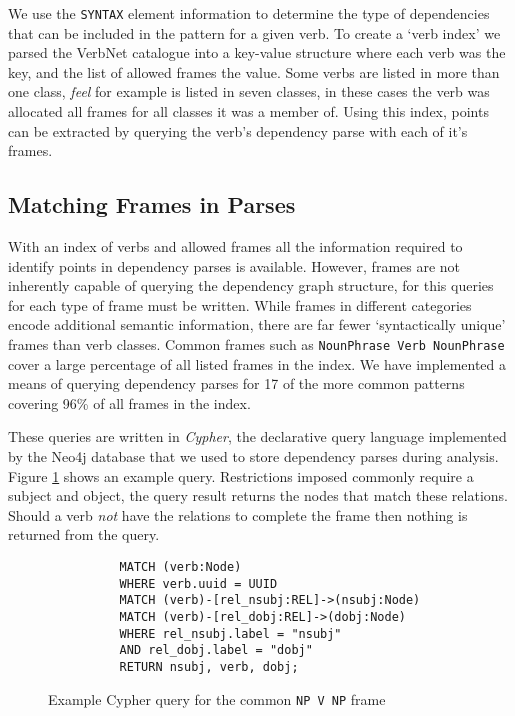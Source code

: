       We use the \texttt{SYNTAX} element information to determine the type of dependencies that can be included in the pattern for a given verb. To create a `verb index' we parsed the VerbNet catalogue into a key-value structure where each verb was the key, and the list of allowed frames the value. Some verbs are listed in more than one class, \textit{feel} for example is listed in seven classes, in these cases the verb was allocated all frames for all classes it was a member of. Using this index, points can be extracted by querying the verb's dependency parse with each of it's frames.

    \tocless\subsection{Matching Frames in Parses}
      With an index of verbs and allowed frames all the information required to identify points in dependency parses is available. However, frames are not inherently capable of querying the dependency graph structure, for this queries for each type of frame must be written. While frames in different categories encode additional semantic information, there are far fewer `syntactically unique' frames than verb classes. Common frames such as \texttt{NounPhrase Verb NounPhrase} cover a large percentage of all listed frames in the index. We have implemented a means of querying dependency parses for 17 of the more common patterns covering 96\% of all frames in the index.

      These queries are written in \textit{Cypher}, the declarative query language implemented by the Neo4j database that we used to store dependency parses during analysis. Figure \ref{fig:npvnpquery} shows an example query. Restrictions imposed commonly require a subject and object, the query result returns the nodes that match these relations. Should a verb \textit{not} have the relations to complete the frame then nothing is returned from the query.

      \begin{figure}
        \centering
        \caption{Example Cypher query for the common \texttt{NP V NP} frame}

        \begin{lstlisting}
          MATCH (verb:Node)
          WHERE verb.uuid = UUID
          MATCH (verb)-[rel_nsubj:REL]->(nsubj:Node)
          MATCH (verb)-[rel_dobj:REL]->(dobj:Node)
          WHERE rel_nsubj.label = "nsubj"
          AND rel_dobj.label = "dobj"
          RETURN nsubj, verb, dobj;
        \end{lstlisting}
        \label{fig:npvnpquery}
      \end{figure}

